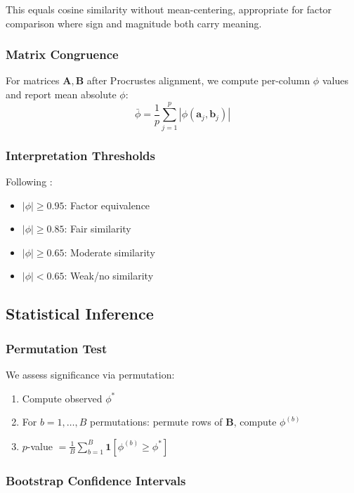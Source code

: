 \documentclass[11pt,twocolumn]{article}
\begin{document}
This equals cosine similarity without mean-centering, appropriate for factor comparison where sign and magnitude both carry meaning.

\subsubsection{Matrix Congruence}

For matrices $\mathbf{A}, \mathbf{B}$ after Procrustes alignment, we compute per-column $\phi$ values and report mean absolute $\phi$:
\begin{equation}
\bar{\phi} = \frac{1}{p} \sum_{j=1}^p |\phi(\mathbf{a}_j, \mathbf{b}_j)|
\end{equation}

\subsubsection{Interpretation Thresholds}

Following \citet{lorenzo2006tuckers}:
\begin{itemize}
    \item $|\phi| \geq 0.95$: Factor equivalence
    \item $|\phi| \geq 0.85$: Fair similarity
    \item $|\phi| \geq 0.65$: Moderate similarity
    \item $|\phi| < 0.65$: Weak/no similarity
\end{itemize}

\subsection{Statistical Inference}

\subsubsection{Permutation Test}

We assess significance via permutation:
\begin{enumerate}
    \item Compute observed $\phi^*$
    \item For $b = 1, \ldots, B$ permutations: permute rows of $\mathbf{B}$, compute $\phi^{(b)}$
    \item $p$-value $= \frac{1}{B} \sum_{b=1}^B \mathbf{1}[\phi^{(b)} \geq \phi^*]$
\end{enumerate}

\subsubsection{Bootstrap Confidence Intervals}
\end{document}
